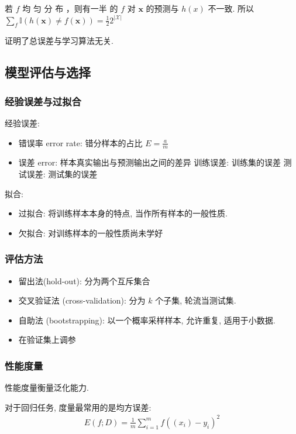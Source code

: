 若 $f$ 均 匀 分 布 ，则有一半 的 $f$ 对 $\bm{x}$ 的预测与 $h(x)$ 不一致. 所以 $\sum_f \mathbb{I}(h(\bm x) \ne f (\bm x ))=\frac{1}{2}2^{|\mathcal{X}|}$

证明了总误差与学习算法无关. 

\subsection{模型评估与选择}

\subsubsection{经验误差与过拟合}
经验误差: 
\begin{itemize}
    \item 错误率 error rate: 错分样本的占比 $E=\frac{a}{m}$
    \item 误差 error: 样本真实输出与预测输出之间的差异
    \subitem 训练误差: 训练集的误差
    \subitem 测试误差: 测试集的误差
\end{itemize}

拟合:
\begin{itemize}
    \item 过拟合: 将训练样本本身的特点, 当作所有样本的一般性质. 
    \item 欠拟合: 对训练样本的一般性质尚未学好
\end{itemize}

\subsubsection{评估方法}
\begin{itemize}
    \item 留出法(hold-out): 分为两个互斥集合
    \item 交叉验证法 (cross-validation): 分为 $k$ 个子集, 轮流当测试集. 
    \item 自助法 (bootstrapping): 以一个概率采样样本, 允许重复, 适用于小数据. 
    \item 在验证集上调参
\end{itemize}


\subsubsection{性能度量}
性能度量衡量泛化能力. 

对于回归任务, 度量最常用的是均方误差:
\begin{align*}
    E(f;D)=\frac{1}{m}\sum_{i=1}^mf((x_i)-y_i)^2
\end{align*}



